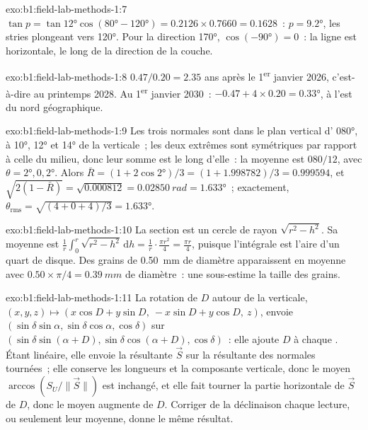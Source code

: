 \begin{solution}{exo:b1:field-lab-methods-1:7}
$\tan p = \tan\ang{12}\cos(\ang{80} - \ang{120}) = 0.2126\times0.7660 =
0.1628$~: $p = \ang{9.2}$, les stries plongeant vers \ang{120}. Pour la direction
\ang{170}, $\cos(\ang{-90}) = 0$~: la ligne est horizontale, le long de la
direction de la couche.
\end{solution}

\begin{solution}{exo:b1:field-lab-methods-1:8}
$0.47/0.20 = 2.35$ ans après le 1\textsuperscript{er} janvier 2026, c'est-à-dire
au printemps 2028. Au 1\textsuperscript{er} janvier 2030~:
$-0.47 + 4\times0.20 = \ang{+0.33}$, à l'est du nord géographique.
\end{solution}

\begin{solution}{exo:b1:field-lab-methods-1:9}
Les trois normales sont dans le plan vertical d' \ang{080}, à
\ang{10}, \ang{12} et \ang{14} de la verticale~; les deux extrêmes sont
symétriques par rapport à celle du milieu, donc leur somme est le long d'elle~:
la moyenne est $080/12$, avec $\theta = \ang{2}, 0, \ang{2}$. Alors $\bar R = (1 +
2\cos\ang{2})/3 = (1 + 1.998782)/3 = 0.999594$, et $\sqrt{2(1 - \bar R)} =
\sqrt{0.000812} = \qty{0.02850}{rad} = \ang{1.633}$~; exactement,
$\theta_{\text{rms}} = \sqrt{(4 + 0 + 4)/3} = \ang{1.633}$.
\end{solution}

\begin{solution}{exo:b1:field-lab-methods-1:10}
La section est un cercle de rayon $\sqrt{r^2 - h^2}$. Sa moyenne est
$\frac1r\int_0^r\sqrt{r^2 - h^2}\,\mathrm dh = \frac1r\cdot\frac{\pi r^2}{4}
= \frac{\pi r}{4}$, puisque l'intégrale est l'aire d'un quart de disque. Des
grains de \qty{0.50}{mm} de diamètre apparaissent en moyenne avec
$0.50\times\pi/4 = \qty{0.39}{mm}$ de diamètre~: une  sous-estime la
taille des grains.
\end{solution}

\begin{solution}{exo:b1:field-lab-methods-1:11}
La rotation de $D$ autour de la verticale,
$(x, y, z) \mapsto (x\cos D + y\sin D,\ -x\sin D + y\cos D,\ z)$, envoie
$(\sin\delta\sin\alpha, \sin\delta\cos\alpha, \cos\delta)$ sur
$(\sin\delta\sin(\alpha + D), \sin\delta\cos(\alpha + D), \cos\delta)$~: elle
ajoute $D$ à chaque . Étant linéaire, elle envoie la résultante
$\vec S$ sur la résultante des normales tournées~; elle conserve les longueurs et
la composante verticale, donc le  moyen $\arccos(S_U/\|\vec S\|)$ est
inchangé, et elle fait tourner la partie horizontale de $\vec S$ de $D$, donc le
 moyen augmente de $D$. Corriger de la déclinaison chaque lecture,
ou seulement leur moyenne, donne le même résultat.
\end{solution}

